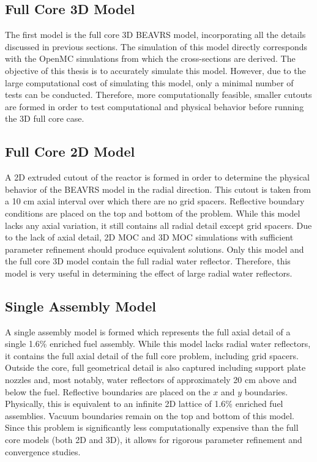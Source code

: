\subsection{Full Core 3D Model}
\label{sec:beavrs-3D}

The first model is the full core 3D BEAVRS model, incorporating all the details discussed in previous sections. The simulation of this model directly corresponds with the OpenMC simulations from which the cross-sections are derived. The objective of this thesis is to accurately simulate this model. However, due to the large computational cost of simulating this model, only a minimal number of tests can be conducted. Therefore, more computationally feasible, smaller cutouts are formed in order to test computational and physical behavior before running the 3D full core case.


\subsection{Full Core 2D Model}
\label{sec:beavrs-2D}

A 2D extruded cutout of the reactor is formed in order to determine the physical behavior of the BEAVRS model in the radial direction. This cutout is taken from a 10 cm axial interval over which there are no grid spacers. Reflective boundary conditions are placed on the top and bottom of the problem. While this model lacks any axial variation, it still contains all radial detail except grid spacers. Due to the lack of axial detail, 2D \ac{MOC} and 3D \ac{MOC} simulations with sufficient parameter refinement should produce equivalent solutions. Only this model and the full core 3D model contain the full radial water reflector. Therefore, this model is very useful in determining the effect of large radial water reflectors. 

\subsection{Single Assembly Model}
\label{sec:beavrs-single-assembly}

A single assembly model is formed which represents the full axial detail of a single 1.6\% enriched fuel assembly. While this model lacks radial water reflectors, it contains the full axial detail of the full core problem, including grid spacers. Outside the core, full geometrical detail is also captured including support plate nozzles and, most notably, water reflectors of approximately 20 cm above and below the fuel. Reflective boundaries are placed on the $x$ and $y$ boundaries. Physically, this is equivalent to an infinite 2D lattice of 1.6\% enriched fuel assemblies. Vacuum boundaries remain on the top and bottom of this model. Since this problem is significantly less computationally expensive than the full core models (both 2D and 3D), it allows for rigorous parameter refinement and convergence studies.

